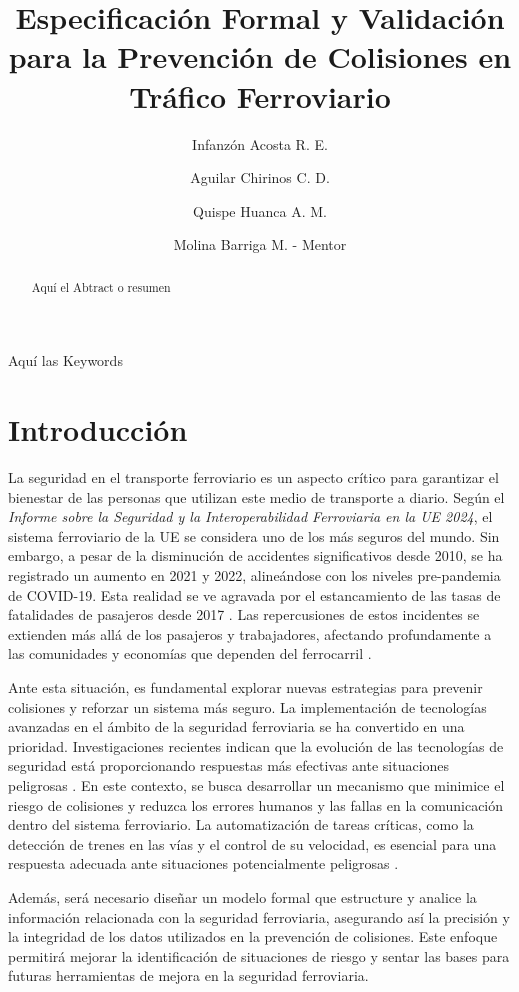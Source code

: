 \documentclass[journal]{IEEEtran}
\title{Especificación Formal y Validación para la Prevención de Colisiones en Tráfico Ferroviario}
\author[1]{Infanzón Acosta R. E.}
\author[1]{Aguilar Chirinos C. D.}
\author[1]{Quispe Huanca A. M.}
\affil{Universidad La Salle, Arequipa, Perú}
\author[2]{Molina Barriga M. - Mentor }
\begin{document}
 

\maketitle

\begin{abstract}
Aquí el Abtract o resumen
\end{abstract}

\begin{IEEEkeywords}
Aquí las Keywords
\end{IEEEkeywords}

\section{Introducción}  
La seguridad en el transporte ferroviario es un aspecto crítico para garantizar el bienestar de las personas que utilizan este medio de transporte a diario. Según el \textit{Informe sobre la Seguridad y la Interoperabilidad Ferroviaria en la UE 2024}, el sistema ferroviario de la UE se considera uno de los más seguros del mundo. Sin embargo, a pesar de la disminución de accidentes significativos desde 2010, se ha registrado un aumento en 2021 y 2022, alineándose con los niveles pre-pandemia de COVID-19. Esta realidad se ve agravada por el estancamiento de las tasas de fatalidades de pasajeros desde 2017 \cite{eu2024}. Las repercusiones de estos incidentes se extienden más allá de los pasajeros y trabajadores, afectando profundamente a las comunidades y economías que dependen del ferrocarril \cite{carrington2019}.  

Ante esta situación, es fundamental explorar nuevas estrategias para prevenir colisiones y reforzar un sistema más seguro. La implementación de tecnologías avanzadas en el ámbito de la seguridad ferroviaria se ha convertido en una prioridad. Investigaciones recientes indican que la evolución de las tecnologías de seguridad está proporcionando respuestas más efectivas ante situaciones peligrosas \cite{decel2021safety}. En este contexto, se busca desarrollar un mecanismo que minimice el riesgo de colisiones y reduzca los errores humanos y las fallas en la comunicación dentro del sistema ferroviario. La automatización de tareas críticas, como la detección de trenes en las vías y el control de su velocidad, es esencial para una respuesta adecuada ante situaciones potencialmente peligrosas \cite{automation2020}.  

Además, será necesario diseñar un modelo formal que estructure y analice la información relacionada con la seguridad ferroviaria, asegurando así la precisión y la integridad de los datos utilizados en la prevención de colisiones. Este enfoque permitirá mejorar la identificación de situaciones de riesgo y sentar las bases para futuras herramientas de mejora en la seguridad ferroviaria.  
\end{document}
